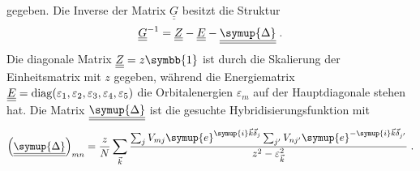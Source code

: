gegeben.
Die Inverse der Matrix  $\underline{\underline{G}}$ besitzt die Struktur 
\begin{equation}
    \underline{\underline{G}}^{-1} = \underline{\underline{Z}} - \underline{\underline{E}} - \underline{\underline{\symup{\Delta}}} \; .
\end{equation}
Die diagonale Matrix $\underline{\underline{Z}} = z\symbb{1}$ ist durch die Skalierung der Einheitsmatrix mit $z$ gegeben, während die Energiematrix 
$\underline{\underline{E}} = \operatorname{diag}(\varepsilon_1, \varepsilon_2, \varepsilon_3, \varepsilon_4, \varepsilon_5)$
die Orbitalenergien $\varepsilon_m$ auf der Hauptdiagonale stehen hat.
Die Matrix $\underline{\underline{\symup{\Delta}}}$ ist die gesuchte Hybridisierungsfunktion mit 
\begin{equation*}
    \left ( \underline{\underline{\symup{\Delta}}} \right )_{mn} =  \frac{z}{N}\sum_{\vec{k}}
    \frac{\sum_j V_{mj}\symup{e}^{\symup{i}\vec{k}\vec{\delta}_j}\sum_{j'} V_{nj'}\symup{e}^{-\symup{i}\vec{k}\vec{\delta}_{j'}}}
    {z^2-\varepsilon_{\vec{k}}^2} \; .
\end{equation*}

